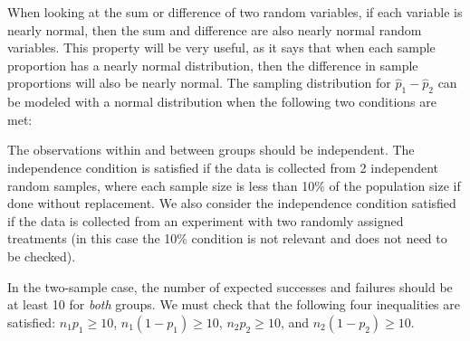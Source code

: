 When looking at the sum or difference of two random variables, if each variable is nearly normal, then the sum and difference are also nearly normal random variables.  This property will be very useful, as it says that when each sample proportion has a nearly normal distribution, then the difference in sample proportions will also be nearly normal.   The sampling distribution for $\hat{p}_1-\hat{p}_2$ can be modeled with a normal distribution when the following two conditions are met:  
\begin{description}
\setlength{\itemsep}{0mm}
\item[Independence.]
  The observations within and between groups should be independent.
  The independence condition is satisfied if the data is collected from 2 independent random samples, where each sample size is less than 10\% of the population size if done without replacement.  We also consider the independence condition satisfied if the data is collected from an experiment with two randomly assigned treatments (in this case the 10\% condition is not relevant and does not need to be checked).
\item[Large counts.]
  In the two-sample case, the number of expected successes and failures
  should be at least 10 for \emph{both} groups.  We must check that the following four inequalities are satisfied:  $n_1p_1 \ge 10$, $n_1(1-p_1) \ge 10$, $n_2p_2 \ge 10$, and $n_2(1-p_2) \ge 10$.
\end{description}

